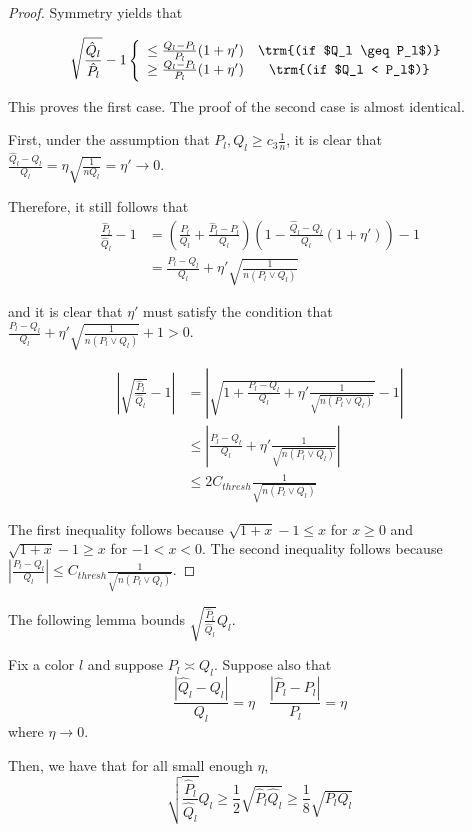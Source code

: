 \documentclass{article}
\begin{document}
\begin{proof}
Symmetry yields that 

\begin{align*}
\sqrt{ \frac{\hat{Q}_l}{\hat{P}_l} } - 1  &
   \left\{ \begin{array}{cc}
      \leq \frac{Q_l - P_l}{P_l} (1 + \eta') & \trm{(if $Q_l \geq P_l$)} \\
      \geq \frac{Q_l - P_l}{P_l} (1 + \eta') & \trm{(if $Q_l < P_l$)} 
     \end{array} \right. \\
\end{align*}

This proves the first case. The proof of the second case is almost identical. 

First, under the assumption that $P_l, Q_l \geq c_3 \frac{1}{n}$, it is clear that $\frac{\hat{Q}_l - Q_l}{Q_l} = \eta \sqrt{ \frac{1}{ n Q_l} } = \eta' \rightarrow 0$. 

Therefore, it still follows that
\begin{align*}
\frac{\hat{P}_l}{\hat{Q}_l} - 1 &= 
     \left( \frac{P_l}{Q_l} + \frac{\hat{P}_l - P_l}{Q_l} \right)
     \left( 1 - \frac{\hat{Q}_l - Q_l}{Q_l} ( 1 + \eta') \right) - 1 \\
 &= \frac{P_l - Q_l}{Q_l} + \eta' \sqrt{ \frac{1}{ n (P_l \vee Q_l)} } 
\end{align*}

and it is clear that $\eta'$ must satisfy the condition that $\frac{P_l - Q_l}{Q_l} + \eta'\sqrt{ \frac{1}{n (P_l \vee Q_l)} } + 1 > 0$. 



\begin{align*}
\left| \sqrt{ \frac{\hat{P}_l}{\hat{Q}_l} } - 1 \right| &= 
 \left|  \sqrt{ 1 + \frac{P_l - Q_l}{Q_l} + \eta' \frac{1}{\sqrt{n (P_l \vee Q_l)} }}
   -1  \right| \\
  &\leq \left| \frac{P_l - Q_l}{Q_l} + \eta' \frac{1}{\sqrt{ n (P_l \vee Q_l)}}        \right| \\
 &\leq 2 C_{thresh} \frac{1}{\sqrt{n (P_l \vee Q_l)} } 
\end{align*}

The first inequality follows because $ \sqrt{1 + x} - 1 \leq x$ for $x \geq 0$ and $\sqrt{ 1 + x} - 1 \geq x$ for $-1 < x < 0$. 
The second inequality follows because $\left| \frac{P_l - Q_l}{Q_l} \right| \leq C_{thresh} \frac{1}{\sqrt{n (P_l \vee Q_l)}} $. 

\end{proof}


The following lemma bounds $\sqrt{ \frac{\hat{P}_l}{\hat{Q}_l} } Q_l$. 
\begin{lemma}
\label{lem:sqrt_ratio_times_ql}

Fix a color $l$ and suppose $P_l \asymp Q_l$. Suppose also that
\[
\frac{|\hat{Q}_l - Q_l|}{Q_l} = \eta \quad 
\frac{|\hat{P}_l - P_l|}{P_l} = \eta
\]
where $\eta \rightarrow 0$. 

Then, we have that for all small enough $\eta$, 
\[
\sqrt{ \frac{\hat{P}_l}{\hat{Q}_l} } Q_l \geq \frac{1}{2} \sqrt{\hat{P}_l \hat{Q}_l} \geq
  \frac{1}{8} \sqrt{P_l Q_l}
\]
\end{lemma}
\end{document}
